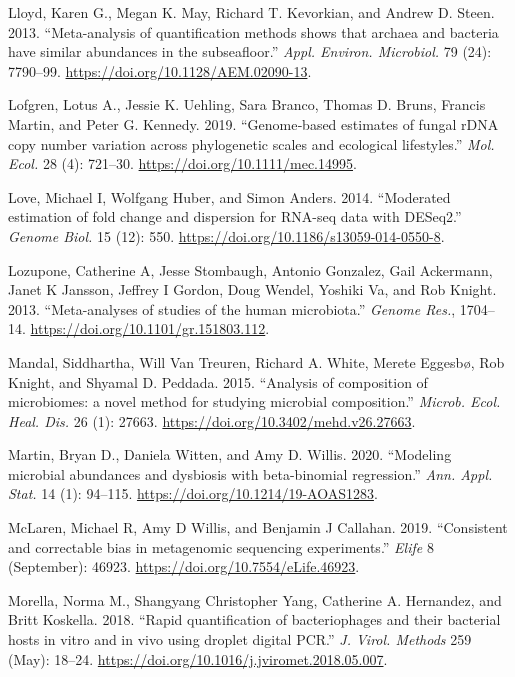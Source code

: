 \documentclass[
]{article}
\newlength{\cslhangindent}
\newlength{\cslentryspacingunit} %
\newenvironment{CSLReferences}[2] %
 {%
  \setlength{\parindent}{0pt}
  \ifodd #1
  \let\oldpar\par
  \def\par{\hangindent=\cslhangindent\oldpar}
  \fi
  \setlength{\parskip}{#2\cslentryspacingunit}
 }%
 {}
\begin{document}
\begin{CSLReferences}{1}{0}
\leavevmode{}%
Lloyd, Karen G., Megan K. May, Richard T. Kevorkian, and Andrew D. Steen. 2013. {``{Meta-analysis of quantification methods shows that archaea and bacteria have similar abundances in the subseafloor}.''} \emph{Appl. Environ. Microbiol.} 79 (24): 7790--99. \url{https://doi.org/10.1128/AEM.02090-13}.

\leavevmode{}%
Lofgren, Lotus A., Jessie K. Uehling, Sara Branco, Thomas D. Bruns, Francis Martin, and Peter G. Kennedy. 2019. {``{Genome‐based estimates of fungal rDNA copy number variation across phylogenetic scales and ecological lifestyles}.''} \emph{Mol. Ecol.} 28 (4): 721--30. \url{https://doi.org/10.1111/mec.14995}.

\leavevmode{}%
Love, Michael I, Wolfgang Huber, and Simon Anders. 2014. {``{Moderated estimation of fold change and dispersion for RNA-seq data with DESeq2}.''} \emph{Genome Biol.} 15 (12): 550. \url{https://doi.org/10.1186/s13059-014-0550-8}.

\leavevmode{}%
Lozupone, Catherine A, Jesse Stombaugh, Antonio Gonzalez, Gail Ackermann, Janet K Jansson, Jeffrey I Gordon, Doug Wendel, Yoshiki Va, and Rob Knight. 2013. {``{Meta-analyses of studies of the human microbiota}.''} \emph{Genome Res.}, 1704--14. \url{https://doi.org/10.1101/gr.151803.112}.

\leavevmode{}%
Mandal, Siddhartha, Will Van Treuren, Richard A. White, Merete Eggesbø, Rob Knight, and Shyamal D. Peddada. 2015. {``{Analysis of composition of microbiomes: a novel method for studying microbial composition}.''} \emph{Microb. Ecol. Heal. Dis.} 26 (1): 27663. \url{https://doi.org/10.3402/mehd.v26.27663}.

\leavevmode{}%
Martin, Bryan D., Daniela Witten, and Amy D. Willis. 2020. {``{Modeling microbial abundances and dysbiosis with beta-binomial regression}.''} \emph{Ann. Appl. Stat.} 14 (1): 94--115. \url{https://doi.org/10.1214/19-AOAS1283}.

\leavevmode{}%
McLaren, Michael R, Amy D Willis, and Benjamin J Callahan. 2019. {``{Consistent and correctable bias in metagenomic sequencing experiments}.''} \emph{Elife} 8 (September): 46923. \url{https://doi.org/10.7554/eLife.46923}.

\leavevmode{}%
Morella, Norma M., Shangyang Christopher Yang, Catherine A. Hernandez, and Britt Koskella. 2018. {``{Rapid quantification of bacteriophages and their bacterial hosts in vitro and in vivo using droplet digital PCR}.''} \emph{J. Virol. Methods} 259 (May): 18--24. \url{https://doi.org/10.1016/j.jviromet.2018.05.007}.


\end{CSLReferences}
\end{document}
